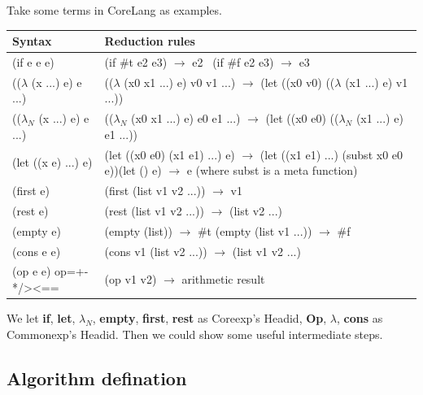 Take some terms in CoreLang as examples. 

\begin{flushleft}
\begin{tabularx}{\textwidth}%
{|>{\setlength{\hsize}{.4\hsize}\centering\arraybackslash}X  |>{\setlength{\hsize}{1.6\hsize}\centering\arraybackslash}X|}
\hline
Syntax & Reduction rules \\ \hline
(if e e e) &\qquad\qquad\qquad(if \#t e2 e3) $\rightarrow$ e2 \newline ~(if \#f e2 e3) $\rightarrow$ e3\\ \hline
(($\lambda$ (x ...) e) e ...) & (($\lambda$ (x0 x1 ...) e) v0 v1 ...) $\rightarrow$ (let ((x0 v0) (($\lambda$ (x1 ...) e) v1 ...))\\ \hline
(($\lambda_N$ (x ...) e) e ...) & (($\lambda_N$ (x0 x1 ...) e) e0 e1 ...) $\rightarrow$ (let ((x0 e0) (($\lambda_N$ (x1 ...) e) e1 ...))\\ \hline
(let ((x e) ...) e) & (let ((x0 e0) (x1 e1) ...) e) $\rightarrow$ (let ((x1 e1) ...) (subst x0 e0 e))\newline (let () e)  $\rightarrow$ e (where subst is a meta function)\\ \hline
(first e) & (first (list v1 v2 ...)) $\rightarrow$ v1\\ \hline
(rest e) & (rest (list v1 v2 ...)) $\rightarrow$ (list v2 ...)\\ \hline
(empty e) & \qquad\qquad\qquad(empty (list)) $\rightarrow$ \#t \newline (empty (list v1 ...)) $\rightarrow$ \#f\\ \hline
(cons e e) & (cons v1 (list v2 ...)) $\rightarrow$ (list v1 v2 ...)\\ \hline
(op e e) \newline op=+-*/><== & (op v1 v2) $\rightarrow$ arithmetic result\\ \hline
\end{tabularx}
\end{flushleft}

We let {\bfseries if}, {\bfseries let}, {\bfseries $\lambda _{N}$}, {\bfseries empty}, {\bfseries first}, {\bfseries rest} as Coreexp's Headid, {\bfseries Op}, {\bfseries $\lambda$}, {\bfseries cons} as Commonexp's Headid. Then we could show some useful intermediate steps.


\subsection{Algorithm defination}

